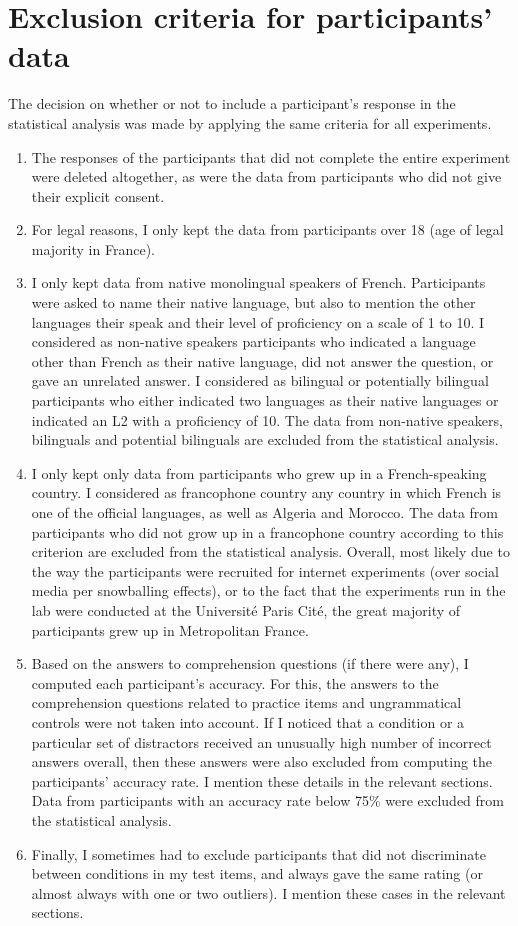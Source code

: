 \chapter{Exclusion criteria for participants' data}
\label{ch:participants-criteria}

The decision on whether or not to include a participant's response in the statistical analysis was made by applying the same criteria for all experiments.

\begin{enumerate}
    \item The responses of the participants that did not complete the entire experiment were deleted altogether, as were the data from participants who did not give their explicit consent.
    \item For legal reasons, I only kept the data from participants over 18 (age of legal majority in France).
    \item I only kept data from native monolingual speakers of French. Participants were asked to name their native language, but also to mention the other languages their speak and their level of proficiency on a scale of 1 to 10. I considered as non-native speakers participants who indicated a language other than French as their native language, did not answer the question, or gave an unrelated answer. I considered as bilingual or potentially bilingual participants who either indicated two languages as their native languages or indicated an L2 with a proficiency of 10. The data from non-native speakers, bilinguals and potential bilinguals are excluded from the statistical analysis.
    \item I only kept only data from participants who grew up in a French-speaking country. I considered as francophone country any country in which French is one of the official languages, as well as Algeria and Morocco. The data from participants who did not grow up in a francophone country according to this criterion are excluded from the statistical analysis. Overall, most likely due to the way the participants were recruited  for internet experiments (over social media per snowballing effects), or to the fact that the experiments run in the lab were conducted at the Université Paris Cité, the great majority of participants grew up in Metropolitan France.
    \item Based on the answers to comprehension questions (if there were any), I computed each participant's accuracy. For this, the answers to the comprehension questions related to practice items and ungrammatical controls were not taken into account. If I noticed that a condition or a particular set of distractors received an unusually high number of incorrect answers overall, then these answers were also excluded from computing the participants' accuracy rate. I mention these details in the relevant sections. Data from participants with an accuracy rate below 75\% were excluded from the statistical analysis.
    \item Finally, I sometimes had to exclude participants that did not discriminate between conditions in my test items, and always gave the same rating (or almost always with one or two outliers). I mention these cases in the relevant sections.
\end{enumerate}

